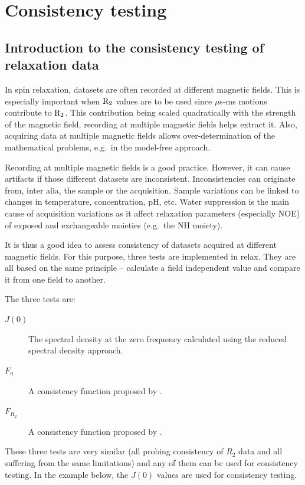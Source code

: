 
\chapter{Consistency testing}



\section{Introduction to the consistency testing of relaxation data}

In spin relaxation, datasets are often recorded at different magnetic fields.
This is especially important when $\mathrm{R}_2$ values are to be used since $\mu$s-ms motions contribute to $\mathrm{R}_2$.
This contribution being scaled quadratically with the strength of the magnetic field, recording at multiple magnetic fields helps extract it.
Also, acquiring data at multiple magnetic fields allows over-determination of the mathematical problems, e.g.\ in the model-free approach.

Recording at multiple magnetic fields is a good practice.
However, it can cause artifacts if those different datasets are inconsistent.
Inconsistencies can originate from, inter alia, the sample or the acquisition.
Sample variations can be linked to changes in temperature, concentration, pH, etc.
Water suppression is the main cause of acquisition variations as it affect relaxation parameters (especially NOE) of exposed and exchangeable moieties (e.g.\ the NH moiety).

It is thus a good idea to assess consistency of datasets acquired at different magnetic fields.
For this purpose, three tests are implemented in relax.
They are all based on the same principle -- calculate a field independent value and compare it from one field to another.

The three tests are:
\begin{description}
  \item[$J(0)$]  The spectral density at the zero frequency calculated using the reduced spectral density approach.
  \item[$F_\eta$]  A consistency function proposed by \citet{Fushman98}.
  \item[$F_{R_2}$]  A consistency function proposed by \citet{Fushman98}.
\end{description}

These three tests are very similar (all probing consistency of $R_2$ data and all suffering from the same limitations) and any of them can be used for consistency testing.
In the example below, the $J(0)$ values are used for consistency testing.

